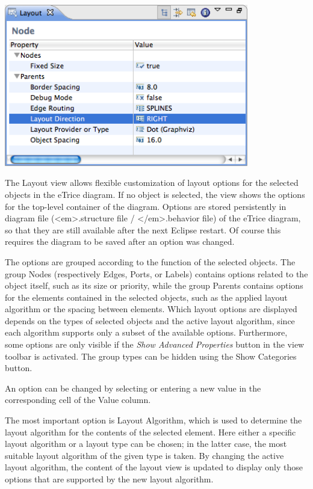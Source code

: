 \includegraphics[width=0.8\textwidth]{images/043-LayoutView.png}

The Layout view allows flexible customization of layout options for the selected objects in the eTrice 
diagram. If no object is selected, the view shows the options for the top-level container of the diagram. 
Options are stored persistently in diagram file (<em>.structure file / </em>.behavior file) of the eTrice 
diagram, so that they are still available after the next Eclipse restart. Of course this requires the 
diagram to be saved after an option was changed.

The options are grouped according to the function of the selected objects. The group Nodes (respectively 
Edges, Ports, or Labels) contains options related to the object itself, such as its size or priority, 
while the group Parents contains options for the elements contained in the selected objects, such as the 
applied layout algorithm or the spacing between elements. Which layout options are displayed depends on 
the types of selected objects and the active layout algorithm, since each algorithm supports only a subset 
of the available options. Furthermore, some options are only visible if the \textit{Show Advanced 
Properties} button in the view toolbar is activated. The group types can be hidden using the Show 
Categories button.

An option can be changed by selecting or entering a new value in the corresponding cell of the Value column.

The most important option is Layout Algorithm, which is used to determine the layout algorithm for the 
contents of the selected element. Here either a specific layout algorithm or a layout type can be chosen; 
in the latter case, the most suitable layout algorithm of the given type is taken. By changing the active 
layout algorithm, the content of the layout view is updated to display only those options that are 
supported by the new layout algorithm.

